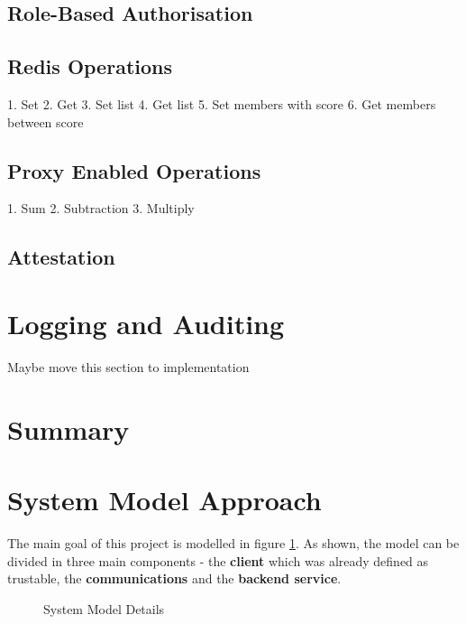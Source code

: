 \subsection{Role-Based Authorisation}
\label{ssec:role-based_authorisation}

\subsection{Redis Operations}
\label{ssec:redis_operations}

1. Set
2. Get
3. Set list
4. Get list
5. Set members with score
6. Get members between score

\subsection{Proxy Enabled Operations}
\label{ssec:proxy_enabled_operations}

1. Sum 
2. Subtraction
3. Multiply

\subsection{Attestation}
\label{ssec:proxy_attestation}

\section{Logging and Auditing} %
\label{sec:logging_and_auditing}

Maybe move this section to implementation

\section{Summary} %
\label{sec:chapter3_summary}


\section{System Model Approach} %
\label{sec:system_model_approach}

The main goal of this project is modelled in figure \ref{fig:syste_model_detailed}. As shown, the model can be divided in three main components - the \textbf{client} which was already defined as trustable, the \textbf{communications} and the \textbf{backend service}. 

\begin{figure}[htbp]
  \caption{System Model Details}
  \label{fig:syste_model_detailed}
\end{figure}

